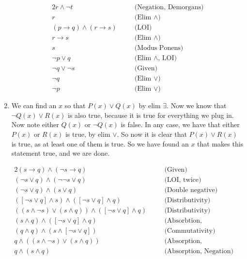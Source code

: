 \documentclass[12pt]{article}
\theoremstyle{definition}
\theoremstyle{remark}
\newcommand{\ra}{\rightarrow}
\newcommand{\justif}[1]{&\quad &\text{(#1)}}
\begin{document}
\begin{enumerate}[leftmargin=\labelsep]
\begin{alignat*}{2}
				r \land \lnot t \justif{Negation, Demorgans} \\
				r \justif{Elim $\land$} \\
				(p \ra q) \land (r \ra s) \justif{LOI} \\
				r \ra s \justif{Elim $\land$} \\
				s \justif{Modus Ponens} \\
				\lnot p \lor q \justif{Elim $\land$, LOI} \\
				\lnot q \lor \lnot s \justif{Given} \\
				\lnot q \justif{Elim $\lor$} \\
				\lnot p \justif{Elim $\lor$}
			\end{alignat*}
		\item 
		We can find an $x$ so that $P(x) \lor Q(x)$ by elim $\exists$. Now we know that $\lnot Q(x) \lor R(x)$ is also true, because it is true for everything we plug in. Now note either $Q(x)$ or $\lnot Q(x)$ is false. In any case, we have that either $P(x)$ or $R(x)$ is true, by elim $\lor$. So now it is clear that $P(x) \lor R(x)$ is true, as at least one of them is true. So we have found an $x$ that makes this statement true, and we are done.
		
		\newpage
		\begin{alignat*}{2}
			(s \ra q) \land (\lnot s \ra q) \justif{Given} \\
			(\lnot s \lor q) \land (\lnot \lnot s \lor q) \justif{LOI, twice} \\
			(\lnot s \lor q) \land (s \lor q) \justif{Double negative} \\
			([\lnot s \lor q] \land s) \land ([\lnot s \lor q] \land q) \justif{Distributivity} \\
			((s \land \lnot s) \lor (s \land q)) \land ([\lnot s \lor q] \land q) \justif{Distributivity} \\
			(s \land q) \land ([\lnot s \lor q] \land q) \justif{Absorbtion, Commutativity} \\
			(q \land q) \land (s \land [\lnot s \lor q]) \justif{Commutativity} \\
			q \land ((s \land \lnot s) \lor (s \land q)) \justif{Absorption, Distributivity} \\
			q \land (s \land q) \justif{Absorption, Negation}
		\end{alignat*}
		\end{enumerate}
\end{document}
